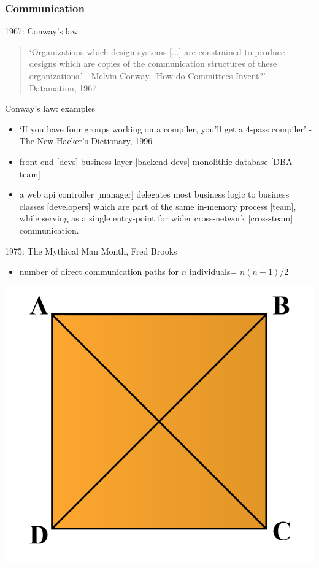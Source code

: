 \documentclass{beamer}
\begin{document}
	\subsubsection{Communication}
	\begin{frame}{1967: Conway's law}
		\begin{quote}
			`Organizations which design systems [...] are constrained to produce designs which are copies of the communication structures of these organizations.' - Melvin Conway, `How do Committees Invent?' Datamation, 1967
		\end{quote}
	\end{frame}
	\begin{frame}{Conway's law: examples}
		\begin{itemize}
			\item `If you have four groups working on a compiler, you'll get a 4-pass compiler' - The New Hacker's Dictionary, 1996\pause
			\item front-end [devs] business layer [backend devs] monolithic database [DBA team] \pause
			\item a web api controller [manager]  delegates most business logic to business classes [developers] which are part of the same in-memory process [team], while serving as a single entry-point for wider cross-network [cross-team] communication.
		\end{itemize}
	\end{frame}
	\begin{frame}{1975: The Mythical Man Month, Fred Brooks}
		
		\begin{itemize}
			\item number of direct communication paths for $n$ individuals= $n(n-1)/2$
		\end{itemize}
		\begin{center}
			\includegraphics[width=.5\textwidth]{square}
		\end{center}
		
	\end{frame}
\end{document}
